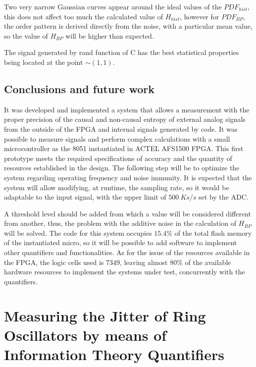 Two very narrow Gaussian curves appear around the ideal values of the $PDF_{hist}$, this does not affect too much the calculated value of $H_{hist}$, however for $PDF_{BP}$, the order pattern is derived directly from the noise, with a particular mean value, so the value of $H_{BP}$ will be higher than expected.

The signal generated by rand function of C has the best statistical properties being located at the point $\sim(1,1)$.

\subsection{Conclusions and future work}
\label{sec:conclusiones}
%
It was developed and implemented a system that allows a measurement with the proper precision of the causal and non-causal entropy of external analog signals from the outside of the FPGA and internal signals generated by code.
It was possible to measure signals and perform complex calculations with a small microcontroller as the 8051  instantiated in ACTEL AFS1500 FPGA. This first prototype meets the required specifications of accuracy and the quantity of resources established in the design. The following step will be to optimize the system regarding operating frequency and noise immunity.
It is expected that the system will allow modifying, at runtime, the sampling rate, so it would be adaptable to the input signal, with the upper limit of $500~Ks/s$ set by the ADC.

A threshold level should be added from which a value will be considered different from another, thus, the problem with the additive noise in the calculation of $H_{BP}$ will be solved.
The code for this system occupies $15.4\%$ of the total flash memory of the instantiated micro, so it will be possible to add software to implement other quantifiers and functionalities. As for the issue of the resources available in the FPGA, the logic cells used is $7349$, leaving almost $80\%$ of the available hardware resources to implement the systems under test, concurrently with the quantifiers.




\section{Measuring the Jitter of Ring Oscillators by means of Information Theory Quantifiers}

